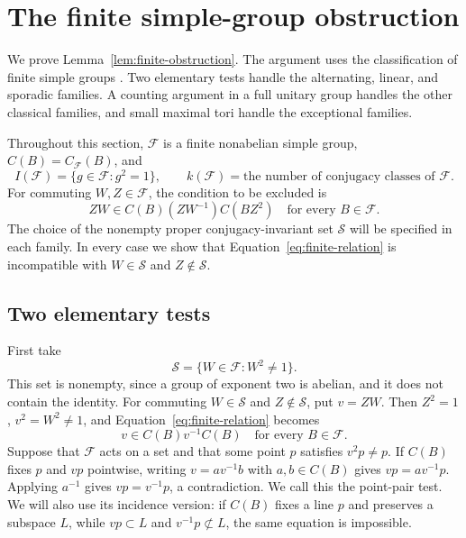 \section{The finite simple-group obstruction}\label{sec:finite-groups}

We prove Lemma~\ref{lem:finite-obstruction}. The argument uses the
classification of finite simple groups
\cite[Classification Theorem, p.~737]{Aschbacher2004}.
Two elementary tests handle the
alternating, linear, and sporadic families. A counting argument in a full
unitary group handles the other classical families, and small maximal tori
handle the exceptional families.

Throughout this section, $\mathcal F$ is a finite nonabelian simple group,
$C(B)=C_{\mathcal F}(B)$, and
\[
 I(\mathcal F)=\{g\in\mathcal F:g^2=1\},\qquad
 k(\mathcal F)=\text{the number of conjugacy classes of }\mathcal F.
\]
For commuting $W,Z\in\mathcal F$, the condition to be excluded is
\begin{equation}\label{eq:finite-relation}
 ZW\in C(B)(ZW^{-1})C(BZ^2)
 \quad\text{for every }B\in\mathcal F.
\end{equation}
The choice of the nonempty proper conjugacy-invariant set $\mathcal S$
will be specified in each family. In every case we show that
Equation~\eqref{eq:finite-relation} is incompatible with
$W\in\mathcal S$ and $Z\notin\mathcal S$.

\subsection{Two elementary tests}

First take
\begin{equation}\label{eq:finite-square-set}
 \mathcal S=\{W\in\mathcal F:W^2\ne1\}.
\end{equation}
This set is nonempty, since a group of exponent two is abelian, and it
does not contain the identity. For commuting $W\in\mathcal S$ and
$Z\notin\mathcal S$, put $v=ZW$. Then $Z^2=1$, $v^2=W^2\ne1$, and
Equation~\eqref{eq:finite-relation} becomes
\begin{equation}\label{eq:finite-inverse-coset}
 v\in C(B)v^{-1}C(B)\quad\text{for every }B\in\mathcal F.
\end{equation}
Suppose that $\mathcal F$ acts on a set and that some point $p$ satisfies
$v^2p\ne p$. If $C(B)$ fixes $p$ and $vp$ pointwise, writing
$v=a v^{-1}b$ with $a,b\in C(B)$ gives
$vp=a v^{-1}p$. Applying $a^{-1}$ gives $vp=v^{-1}p$, a contradiction.
We call this the point-pair test. We will also use its incidence version:
if $C(B)$ fixes a line $p$ and preserves a subspace $L$, while $vp\subset L$
and $v^{-1}p\not\subset L$, the same equation is impossible.

